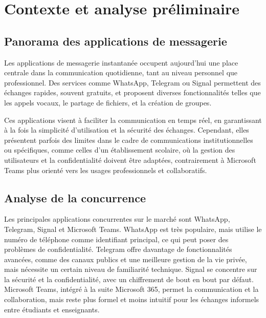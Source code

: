 \documentclass[12pt]{report}
\begin{document}
	\chapter{Contexte et analyse préliminaire}
	
	\section{Panorama des applications de messagerie}
	
	Les applications de messagerie instantanée occupent aujourd’hui une place centrale dans la communication quotidienne, tant au niveau personnel que professionnel. Des services comme WhatsApp\supercite{whatsapp}, Telegram\supercite{telegram} ou Signal\supercite{signal} permettent des échanges rapides, souvent gratuits, et proposent diverses fonctionnalités telles que les appels vocaux, le partage de fichiers, et la création de groupes.
	
	Ces applications visent à faciliter la communication en temps réel, en garantissant à la fois la simplicité d’utilisation et la sécurité des échanges. Cependant, elles présentent parfois des limites dans le cadre de communications institutionnelles ou spécifiques, comme celles d’un établissement scolaire, où la gestion des utilisateurs et la confidentialité doivent être adaptées, contrairement à Microsoft Teams\supercite{teams} plus orienté vers les usages professionnels et collaboratifs.
	
	\section{Analyse de la concurrence}
	
	Les principales applications concurrentes sur le marché sont WhatsApp\supercite{whatsapp}, Telegram\supercite{telegram}, Signal\supercite{signal} et Microsoft Teams\supercite{teams}. WhatsApp\supercite{whatsapp} est très populaire, mais utilise le numéro de téléphone comme identifiant principal, ce qui peut poser des problèmes de confidentialité. Telegram\supercite{telegram} offre davantage de fonctionnalités avancées, comme des canaux publics et une meilleure gestion de la vie privée, mais nécessite un certain niveau de familiarité technique. Signal\supercite{signal} se concentre sur la sécurité et la confidentialité, avec un chiffrement de bout en bout par défaut. Microsoft Teams\supercite{teams}, intégré à la suite Microsoft 365, permet la communication et la collaboration, mais reste plus formel et moins intuitif pour les échanges informels entre étudiants et enseignants.  
	
\end{document}
